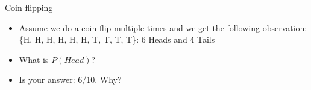 \documentclass{beamer}
\begin{document}



\begin{frame}{Coin flipping}
\begin{itemize}
	\item Assume we do a coin flip multiple times and we get the following observation: \{H, H, H, H, H, H, T, T, T, T\}: 6 Heads and 4 Tails
	\item  What is $P(Head)$?
	\item Is your answer: 6/10. Why?
\end{itemize}

\end{frame}
\end{document}
